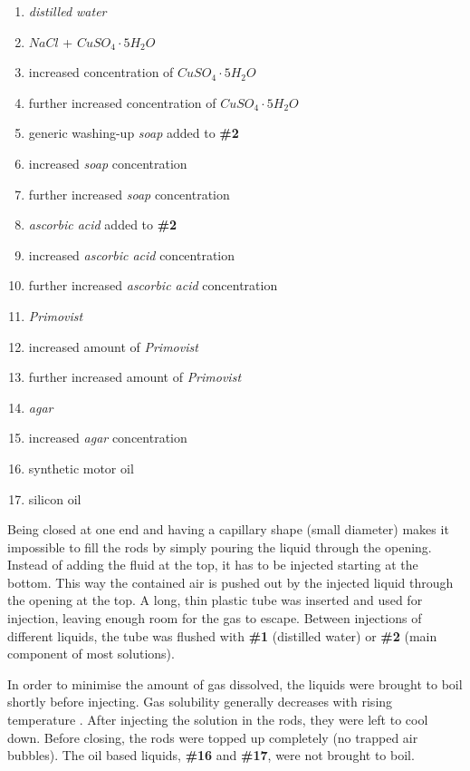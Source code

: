 \newpage
\begin{enumerate}[label=\textbf{\#\arabic*}]
 \item \textit{distilled water}
 \item $NaCl$ + $CuSO_4\cdot5H_2O$
 \item increased concentration of $CuSO_4\cdot5H_2O$
 \item further increased concentration of $CuSO_4\cdot5H_2O$
 \item generic washing-up \textit{soap} added to \textbf{\#2}
 \item increased \textit{soap} concentration
 \item further increased \textit{soap} concentration
 \item \textit{ascorbic acid} added to \textbf{\#2}
 \item increased \textit{ascorbic acid} concentration
 \item further increased \textit{ascorbic acid} concentration
 \item \textit{Primovist}
 \item increased amount of \textit{Primovist}
 \item further increased amount of \textit{Primovist}
 \item \textit{agar}
 \item increased \textit{agar} concentration
 \item synthetic motor oil
 \item silicon oil
\end{enumerate}

Being closed at one end and having a capillary shape (small diameter) makes it impossible to fill the rods by simply pouring the liquid through the opening.
Instead of adding the fluid at the top, it has to be injected starting at the bottom.
This way the contained air is pushed out by the injected liquid through the opening at the top.
A long, thin plastic tube was inserted and used for injection, leaving enough room for the gas to escape.
Between injections of different liquids, the tube was flushed with \textbf{\#1} (distilled water) or \textbf{\#2} (main component of most solutions).

In order to minimise the amount of gas dissolved, the liquids were brought to boil shortly before injecting. Gas solubility generally decreases with rising temperature \cite{Henry1803, Sander2015}.
After injecting the solution in the rods, they were left to cool down.
Before closing, the rods were topped up completely (no trapped air bubbles).
The oil based liquids, \textbf{\#16} and \textbf{\#17}, were not brought to boil.


